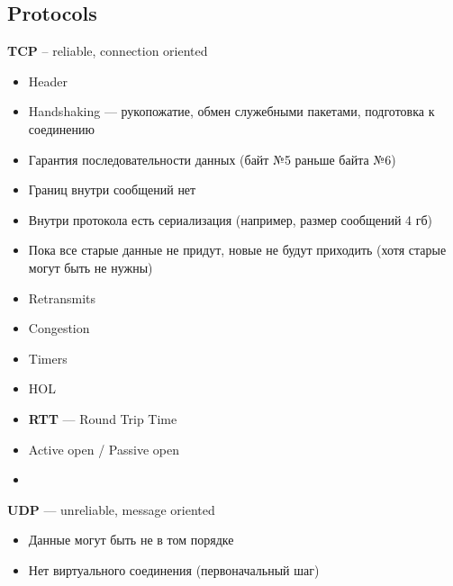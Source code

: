 \subsection{Protocols}
\textbf{TCP} -- reliable, connection oriented
\begin{itemize}
    \item Header
    \item Handshaking --- рукопожатие, обмен служебными пакетами, подготовка к соединению
    \item Гарантия последовательности данных (байт №5 раньше байта №6)
    \item Границ внутри сообщений нет
    \item Внутри протокола есть сериализация (например, размер сообщений 4 гб)
    \item Пока все старые данные не придут, новые не будут приходить (хотя старые могут быть не нужны)
    \item Retransmits
    \item Congestion
    \item Timers
    \item HOL
    \item \textbf{RTT} --- Round Trip Time
    \item Active open / Passive open
    \item {}
\end{itemize}

\textbf{UDP} --- unreliable, message oriented
\begin{itemize}
    \item Данные могут быть не в том порядке
    \item Нет виртуального соединения (первоначальный шаг)
\end{itemize}

